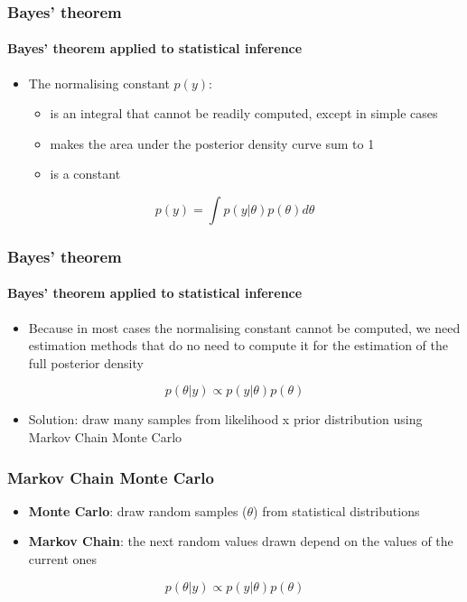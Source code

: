 \documentclass{beamer}
\begin{document}
\begin{frame}
\frametitle{Bayes’ theorem}
\framesubtitle{Bayes’ theorem applied to statistical inference}
\begin{itemize}
 \item{The normalising constant $p(y)$:}
 \begin{itemize}
  \item{is an integral that cannot be readily computed, except in simple cases}
  \item{makes the area under the posterior density curve sum to 1}
  \item{is a constant}
 \end{itemize}
\end{itemize}
\vspace{.5cm}
\Large
$$p(y)=\int p(y|\theta)p(\theta)d\theta$$
\end{frame}

\begin{frame}
\frametitle{Bayes’ theorem}
\framesubtitle{Bayes’ theorem applied to statistical inference}
\begin{itemize}
 \item{Because in most cases the normalising constant cannot be computed, we need estimation methods that do no need to compute it for the estimation of the full posterior density}
\end{itemize}
\vspace{.5cm}
\begin{Large}
$$p(\theta | y) \propto  p(y|\theta) p(\theta)$$
\end{Large}
\begin{itemize}
 \item{Solution: draw many samples from likelihood x prior distribution using Markov Chain Monte Carlo}
\end{itemize}
\end{frame}

\begin{frame}
\frametitle{Markov Chain Monte Carlo}
\begin{itemize}
 \item{\textbf{Monte Carlo}: draw random samples ($\theta$) from statistical distributions}
 \item{\textbf{Markov Chain}: the next random values drawn depend on the values of the current ones}
\end{itemize}
\begin{Large}
$$p(\theta | y) \propto  p(y|\theta) p(\theta)$$
\end{Large}
\end{frame}
\end{document}

